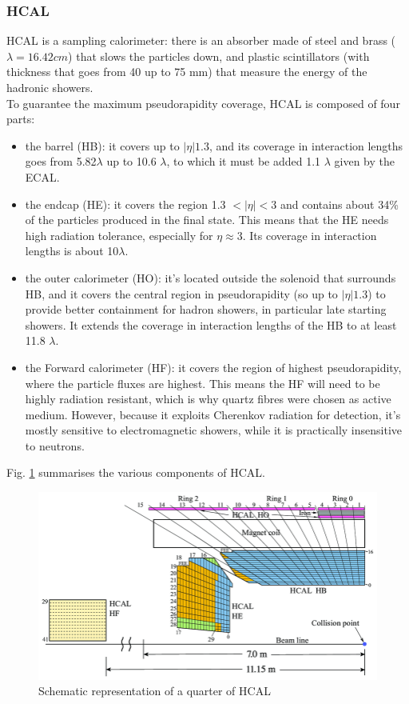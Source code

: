 \subsubsection{HCAL}
HCAL is a sampling calorimeter: there is an absorber made of steel and brass ($\lambda = 16.42 cm $) that slows the particles down, and plastic scintillators (with thickness that goes from 40 up to 75 mm) that measure the energy of the hadronic showers.\\
To guarantee the maximum pseudorapidity coverage, HCAL is composed of four parts:
\begin{itemize}
    \item the barrel (HB): it covers up to $|\eta| 1.3$, and its coverage in interaction lengths goes from 5.82$\lambda$ up to  10.6 $\lambda$, to which it must be added 1.1 $\lambda$ given by the ECAL.
    \item the endcap (HE): it covers the region 1.3 $<|\eta| < 3$ and contains about 34\% of the particles produced in the final state. This means that the HE needs high radiation tolerance, especially for $\eta\approx$3. Its coverage in interaction lengths is about 10$\lambda$.
    \item the outer calorimeter (HO): it's located outside the solenoid that surrounds HB, and it covers the central region in pseudorapidity (so up to $|\eta| 1.3$) to provide better containment for hadron showers, in particular late starting showers. It extends the coverage in interaction lengths of the HB to at least 11.8 $\lambda$.
    \item the Forward calorimeter (HF): it covers the region of highest pseudorapidity, where the particle fluxes are highest. This means the HF will need to be highly radiation resistant, which is why quartz fibres were chosen as active medium. However, because it exploits Cherenkov radiation for detection, it's mostly sensitive to electromagnetic showers, while it is practically insensitive to neutrons.
\end{itemize}

Fig. \ref{hcal} summarises the various components of HCAL.
\begin{figure}[ht]
    \centering
    \includegraphics[width = 0.8\linewidth]{images/hcal.png}
    \caption{Schematic representation of a quarter of HCAL}
    \label{hcal}
\end{figure}
